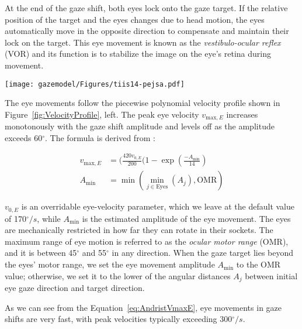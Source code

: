 At the end of the gaze shift, both eyes lock onto the gaze target. If the relative position of the target and the eyes changes due to head motion, the eyes automatically move in the opposite direction to compensate and maintain their lock on the target. This eye movement is known as the \emph{vestibulo-ocular reflex} (VOR) and its function is to stabilize the image on the eye's retina during movement.

\begin{figure*}
\centering
\texttt{[image: gazemodel/Figures/tiis14-pejsa.pdf]}
\caption{Velocity profiles for the motion of different body parts. Left: Eye velocity. Right: Head and torso velocities. Mathematical expressions for the profiles are given in equations~\ref{eq:EyeVelocity} and~\ref{eq:HeadTorsoVelocity}.}
\label{fig:VelocityProfile}
\end{figure*}

The eye movements follow the piecewise polynomial velocity profile shown in Figure~\ref{fig:VelocityProfile}, left. The peak eye velocity $v_{\mathrm{max},E}$ increases monotonously with the gaze shift amplitude and levels off as the amplitude exceeds 60$^{\circ}$. The formula is derived from \citet{baloh1975quantitative}:

\begin{align} \label{eq:AndristVmaxE}
v_{\mathrm{max},E} &= (\frac{420 v_{0,E}}{200} (1 - \mathop{exp}(\frac{-A_{\mathrm{min}}}{14}) \\
A_{\mathrm{min}} &= \mathop{min}( \mathop{min}_{j \in \mathrm{Eyes}}(A_j), \mathrm{OMR} ) \nonumber
\end{align}

$v_{0,E}$ is an overridable eye-velocity parameter, which we leave at the default value of 170$^{\circ}/s$, while $A_{\mathrm{min}}$ is the estimated amplitude of the eye movement. The eyes are mechanically restricted in how far they can rotate in their sockets. The maximum range of eye motion is referred to as the \emph{ocular motor range} (OMR), and it is between 45$^{\circ}$ and 55$^{\circ}$ in any direction. When the gaze target lies beyond the eyes' motor range, we set the eye movement amplitude $A_{\mathrm{min}}$ to the OMR value; otherwise, we set it to the lower of the angular distances $A_j$ between initial eye gaze direction and target direction.

As we can see from the Equation~\ref{eq:AndristVmaxE}, eye movements in gaze shifts are very fast, with peak velocities typically exceeding 300$^{\circ}/s$.

